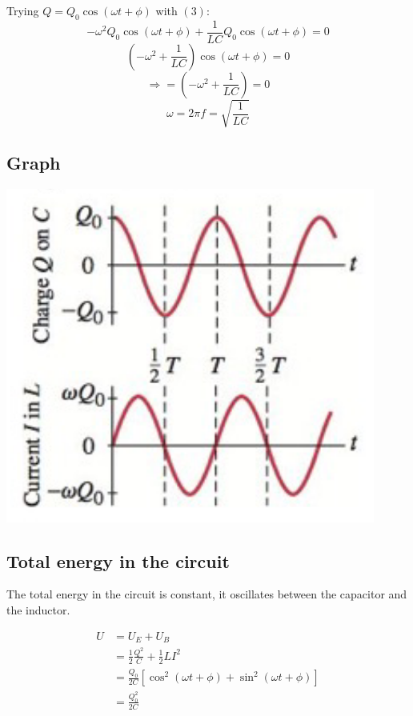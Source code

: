 \documentclass[11pt]{article}
\begin{document}
Trying \(Q = Q_0 \cos (\omega t + \phi)\) with \((3)\):
\[- \omega^2 Q_0 \cos (\omega t + \phi) + \frac{1}{LC} Q_0 \cos (\omega t + \phi) = 0\]
\[\left(- \omega^2 + \frac{1}{LC} \right) \cos ( \omega t + \phi ) = 0\]
\[\Longrightarrow = \left(- \omega^2 + \frac{1}{LC} \right) = 0\]
\[\omega = 2 \pi f = \sqrt{\frac{1}{LC}}\]

\subsection{Graph}
\label{sec:org4b6fad2}

\begin{center}
\includegraphics[scale=0.8]{./images/lc-circuit-graph.png}
\end{center}

\subsection{Total energy in the circuit}
\label{sec:org9b8bcea}
The total energy in the circuit is constant, it oscillates between the capacitor and the inductor.

\begin{align*}
U &= U_E + U_B \\
&= \frac{1}{2} \frac{Q^2}{C} + \frac{1}{2} LI^2 \\
&= \frac{Q_0}{2C} \left[\cos^2 (\omega t + \phi) + \sin^2 (\omega t + \phi) \right] \\
&= \frac{Q_0^2}{2C}
\end{align*}
\end{document}
